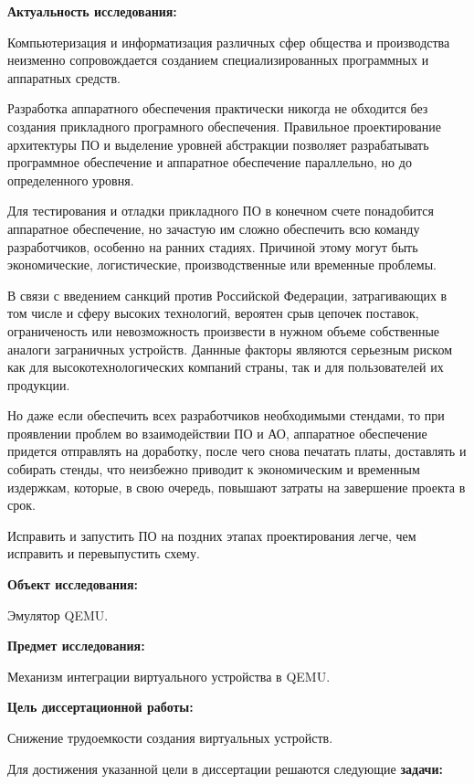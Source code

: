 \textbf{Актуальность исследования:}

Компьютеризация и информатизация различных сфер общества и производства неизменно
сопровождается созданием специализированных программных и аппаратных средств.

Разработка аппаратного обеспечения практически никогда не обходится без создания
прикладного програмного обеспечения.
Правильное проектирование архитектуры ПО и выделение уровней абстракции позволяет
разрабатывать программное обеспечение и аппаратное обеспечение параллельно, но
до определенного уровня.

Для тестирования и отладки прикладного ПО в конечном счете понадобится аппаратное обеспечение,
но зачастую им сложно обеспечить всю команду разработчиков, особенно на ранних стадиях.
Причиной этому могут быть экономические, логистические, производственные или временные проблемы.

В связи с введением санкций против Российской Федерации, затрагивающих
в том числе и сферу высоких технологий, вероятен срыв цепочек поставок,
ограниченость или невозможность произвести в нужном объеме собственные
аналоги заграничных устройств.
Даннные факторы являются серьезным риском как для высокотехнологических
компаний страны, так и для пользователей их продукции.

Но даже если обеспечить всех разработчиков необходимыми стендами, то при проявлении
проблем во взаимодействии ПО и АО, аппаратное обеспечение придется отправлять на доработку,
после чего снова печатать платы, доставлять и собирать стенды, что неизбежно приводит к экономическим
и временным издержкам, которые, в свою очередь, повышают затраты на завершение проекта в срок.

Исправить и запустить ПО на поздних этапах проектирования легче, чем исправить и перевыпустить схему.

\textbf{Объект исследования:}

Эмулятор QEMU.

\textbf{Предмет исследования:}

Механизм интеграции виртуального устройства в QEMU.

\textbf{Цель диссертационной работы:}

Снижение трудоемкости создания виртуальных устройств.

Для достижения указанной цели в диссертации решаются
следующие \textbf{задачи:}

